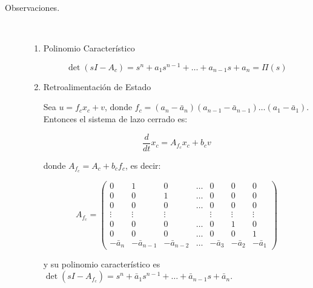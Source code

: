         \begin{description}
            \item [Observaciones.] \mbox{}\\
            \begin{enumerate}
                \item Polinomio Característico

                \begin{equation}
                    \det{(sI - A_c)} = s^n + a_1 s^{n-1} + \dots + a_{n-1} s + a_n = \Pi(s) \nonumber
                \end{equation}

                \item Retroalimentación de Estado

                Sea $u = f_c x_c + v$, donde $f_c = (a_n - \bar{a}_n)(a_{n-1} - \bar{a}_{n-1})\dots(a_1 - \bar{a}_1)$. Entonces el sistema de lazo cerrado es:

                \begin{equation}
                    \frac{d}{dt} x_c = A_{f_c} x_c + b_c v
                \end{equation}

                donde $A_{f_c} = A_c + b_c f_c$, es decir:

                \begin{equation}
                    A_{f_c} =
                    \begin{pmatrix}
                    0 & 1 & 0 & \dots & 0 & 0 & 0 \\
                    0 & 0 & 1 & \dots & 0 & 0 & 0 \\
                    0 & 0 & 0 & \dots & 0 & 0 & 0 \\
                    \vdots & \vdots & \vdots & & \vdots & \vdots & \vdots \\
                    0 & 0 & 0 & \dots & 0 & 1 & 0 \\
                    0 & 0 & 0 & \dots & 0 & 0 & 1 \\
                    -\bar{a}_{n} & -\bar{a}_{n-1} & -\bar{a}_{n-2} & \dots & -\bar{a}_{3} & -\bar{a}_{2} & -\bar{a}_{1}
                    \end{pmatrix}
                \end{equation}

                y su polinomio característico es $\det{(sI - A_{f_c})} = s^n + \bar{a}_1 s^{n-1} + \dots + \bar{a}_{n-1} s + \bar{a}_n$.

            \end{enumerate}
        \end{description}

